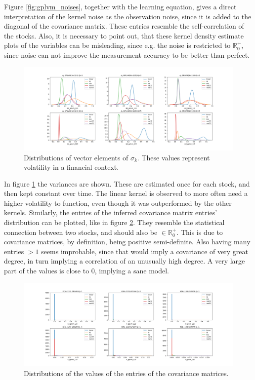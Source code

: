 Figure \ref{fig:gplvm_noises}, together with the learning equation, gives a direct interpretation of the kernel noise as the observation noise, since it is added to the diagonal of the covariance matrix. These entries resemble the self-correlation of the stocks. Also, it is necessary to point out, that these kernel density estimate plots of the variables can be misleading, since e.g. the noise is restricted to $\mathbb{R}_0^+$, since noise can not improve the measurement accuracy to be better than perfect.
\begin{figure}%
	\centering
	\includegraphics[width=7in]{img/07_0/std_GPLVM_120.png}
	\caption[Standard Deviation Distributions GPLVM]
	{Distributions of vector elements of $\sigma_k$. These values represent volatility in a financial context.}
	\label{fig:gplvm_variances}
\end{figure}
In figure \ref{fig:gplvm_variances} the variances are shown. These are estimated once for each stock, and then kept constant over time. The linear kernel is observed to more often need a higher volatility to function, even though it was outperformed by the other kernels. \newline
Similarly, the entries of the inferred covariance matrix entries' distribution can be plotted, like in figure \ref{fig:gplvm_covariances}. They resemble the statistical connection between two stocks, and should also be $\in\mathbb{R}_0^+$. This is due to covariance matrices, by definition, being positive semi-definite. Also having many entries $>1$ seems improbable, since that would imply a covariance of very great degree, in turn implying a correlation of an unusually high degree. A very large part of the values is close to 0, implying a sane model. 
\begin{figure}%
	\centering
	\includegraphics[width=7in]{img/07_0/K_GPLVM_120.png}
	\caption[Covariance Matrix Entry Distributions GPLVM]
	{Distributions of the values of the entries of the covariance matrices. }
	\label{fig:gplvm_covariances}
\end{figure}
